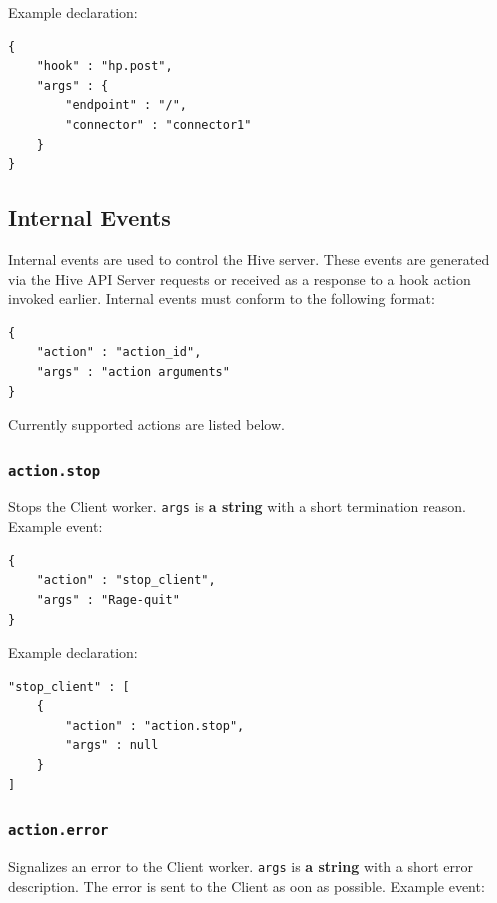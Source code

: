 \documentclass[a4paper]{article}
\begin{document}
\noindent
Example declaration:

\begin{verbatim}
{
    "hook" : "hp.post",
    "args" : {
        "endpoint" : "/",
        "connector" : "connector1"
    }
}
\end{verbatim}
\subsection{Internal Events}
\label{sec-9-3}
\label{ref-internal_events}
\label{ref-hive_events}


Internal events are used to control the Hive server. These events are generated via the Hive API Server requests or received as a response to a hook action invoked earlier. Internal events must conform to the following format:


\begin{verbatim}
{
    "action" : "action_id",
    "args" : "action arguments"
}
\end{verbatim}




\noindent
Currently supported actions are listed below.
\subsubsection{\texttt{action.stop}}
\label{sec-9-3-1}

Stops the Client worker. \texttt{args} is \textbf{a string} with a short termination reason. Example event:


\begin{verbatim}
{
    "action" : "stop_client",
    "args" : "Rage-quit"
}
\end{verbatim}




\noindent
Example declaration:

\begin{verbatim}
"stop_client" : [
    {
        "action" : "action.stop",
        "args" : null
    }
]
\end{verbatim}
\subsubsection{\texttt{action.error}}
\label{sec-9-3-2}

Signalizes an error to the Client worker. \texttt{args} is \textbf{a string} with a short error description. The error is sent to the Client as oon as possible. Example event:
\end{document}
